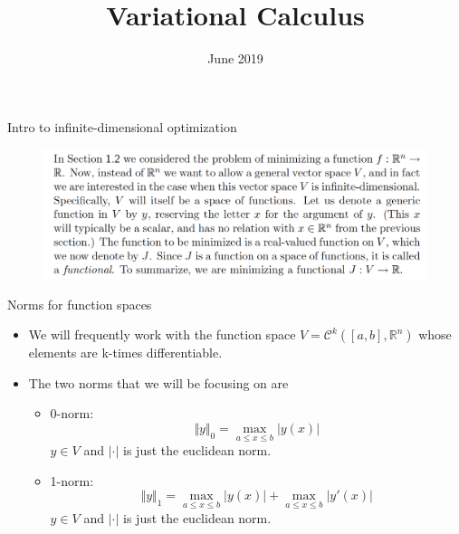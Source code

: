 \documentclass{beamer}
\title{Variational Calculus}
\author{}
\date{June 2019}
\begin{document}
\maketitle

\begin{frame}{Intro to infinite-dimensional optimization}
    \begin{figure}
        \centering
        \includegraphics[width=\linewidth]{ch1/fig1.png}
    \end{figure}
\end{frame}

\begin{frame}{Norms for function spaces}
    \begin{itemize}
        \item We will frequently work with the function space $V = \mathcal{C}^k([a,b], \mathbb{R}^n)$ whose elements are k-times differentiable.
        \item The two norms that we will be focusing on are
        \begin{itemize}
            \item 0-norm:
            \begin{equation}
                \Vert y \Vert_0 = \max_{a \leq x \leq b} \vert y(x) \vert
            \end{equation}
            $y \in V$ and $\vert \cdot \vert$ is just the euclidean norm.
            \item 1-norm:
            \begin{equation}
                \Vert y \Vert_1 = \max_{a \leq x \leq b} \vert y(x) \vert + \max_{a \leq x \leq b} \vert y'(x) \vert
            \end{equation}
            $y \in V$ and $\vert \cdot \vert$ is just the euclidean norm.
        \end{itemize}
    \end{itemize}
\end{frame}
\end{document}
